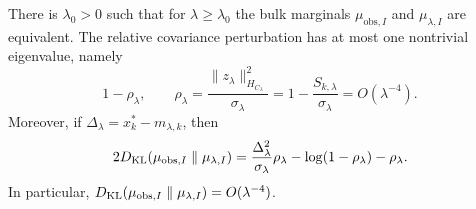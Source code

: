 \begin{lemma}
\label{lem:feldman_hajek}
There is $\lambda_0>0$ such that for $\lambda\ge\lambda_0$ the bulk marginals
$\mu_{\mathrm{obs},I}$ and $\mu_{\lambda,I}$ are equivalent.  The relative
covariance perturbation has at most one nontrivial eigenvalue, namely
\begin{equation}
  1-\rho_\lambda,
  \qquad
  \rho_\lambda
  =
  \frac{\|z_\lambda\|_{H_{C_\lambda}}^2}{\sigma_\lambda}
  =
  1-\frac{S_{k,\lambda}}{\sigma_\lambda}
  =O(\lambda^{-4}).
  \label{eq:rho_lambda_rank_one}
\end{equation}
Moreover, if $\Delta_\lambda=x_k^*-m_{\lambda,k}$, then
\begin{equation}
  2D_{\operatorname{KL}}(\mu_{\mathrm{obs},I}\parallel\mu_{\lambda,I})
  =
  \frac{\Delta_\lambda^2}{\sigma_\lambda}\rho_\lambda
  -\log(1-\rho_\lambda)-\rho_\lambda.
  \label{eq:bulk_KL_rank_one}
\end{equation}
In particular,
$D_{\operatorname{KL}}(\mu_{\mathrm{obs},I}\parallel\mu_{\lambda,I})=O(\lambda^{-4})$.
\end{lemma}

